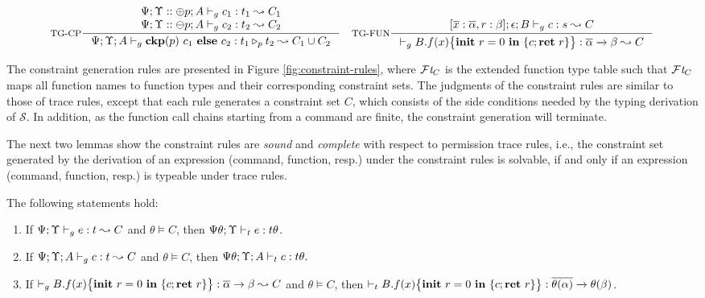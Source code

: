 {{{\begin{figure*}[ht]
\begin{tiny}
\[
\inference[TG-CP]
{
\Psi;\trace::\tplus p; A \vdash_{g} c_1 : t_1  \leadsto C_1 \\
 \Psi;\trace::\tminus p; A \vdash_{g} c_2 : t_2  \leadsto C_2
 }
{\Psi;\trace; A \vdash_{g} \lcCP{p}{c_1}{c_2} : \omerge{p}{t_1}{t_2} \leadsto C_1\cup C_2}
\quad
\inference[TG-FUN]
{
[\overline{x}: \overline{\alpha},\lpRES:\beta]; \epsilon; B \vdash_{g} c : s  \leadsto C
}
{
\vdash_{g} \lpPROG{B.f}{x}{c}{\lpRES} :  \overline{\alpha}\xrightarrow{} \beta  \leadsto  C
}
\]
\end{tiny}
\caption{Constraint generation rules for expressions, commands, and functions, with function type table {\FT}.}
\label{fig:constraint-rules}
\end{figure*}

The constraint generation rules are presented in Figure \ref{fig:constraint-rules}, where
$\mathcal{F}\mathit{t}_{C}$ is the extended function type table such that $\mathcal{F}\mathit{t}_{C}$ maps all function names to function types and their corresponding constraint sets.
The judgments of the constraint rules are similar to those of trace rules, except that
each rule generates a constraint set $C$, which consists of the side conditions needed by the typing derivation of $\mathcal{S}$.
In addition,  as the function call chains starting from a command are finite, the constraint generation will terminate.

 
The next two lemmas show the constraint rules are \emph{sound} and \emph{complete} with respect to permission trace rules, i.e., the constraint set generated by the derivation of an expression (command, function, resp.) under the constraint rules is solvable, if and only if an expression (command, function, resp.) is typeable under trace rules.

\begin{lemma}\label{lem:cgrsound}
The following statements hold:
{\myeqsize
\begin{enumerate}[label={(\alph*)}]
\item\label{lem:cgrsound-1} If $\Psi;\Upsilon \vdash_{g} e : t\leadsto C$ and $\theta \vDash C$, then $\Psi\theta;\Upsilon \vdash_{t} e : t\theta $.

\item\label{lem:cgrsound-2} If $\Psi;\Upsilon; A \vdash_{g} c : t\leadsto C$ and $\theta \vDash C$,
then  $\Psi\theta;\Upsilon;A \vdash_{t} c : t\theta.$

\item\label{lem:cgrsound-3} If $ \vdash_{g} {B.f}(x)\big\{{{\textbf{init}~ {r}=0 ~\textbf{in}~\{{c};\textbf{ret}~{r}\}}}\big\} :  \overline{\alpha}\rightarrow \beta\leadsto C$ and $\theta \vDash C$, then
$
\vdash_{t} {B.f}(x)\big\{{{\textbf{init}~ {r}=0 ~\textbf{in}~\{{c};\textbf{ret}~{r}\}}}\big\} : \overline{\theta(\alpha)}\xrightarrow{}\theta(\beta)
$.


\end{enumerate}}
\end{lemma}}}}
